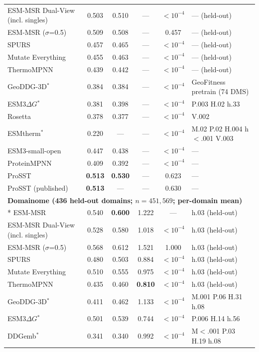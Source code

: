 {\begin{longtable}{lccccl}
ESM-MSR Dual-View (incl. singles) & 0.503 & 0.510 & --- & $<10^{-4}$ & --- (held-out) \\
ESM-MSR ($\sigma$=0.5) & 0.509 & 0.508 & --- & 0.457 & --- (held-out) \\
SPURS & 0.457 & 0.465 & --- & $<10^{-4}$ & --- (held-out) \\
Mutate Everything & 0.455 & 0.463 & --- & $<10^{-4}$ & --- (held-out) \\
ThermoMPNN & 0.439 & 0.442 & --- & $<10^{-4}$ & --- (held-out) \\
GeoDDG-3D$^*$ & 0.384 & 0.384 & --- & $<10^{-4}$ & GeoFitness pretrain (74 DMS) \\
ESM3$\Delta G$$^*$ & 0.381 & 0.398 & --- & $<10^{-4}$ & P.003 H.02 h.33 \\
Rosetta & 0.378 & 0.377 & --- & $<10^{-4}$ & V.002 \\
ESMtherm$^*$ & 0.220 & --- & --- & $<10^{-4}$ & M.02 P.02 H.004 h$<$.001 V.003 \\
ESM3-small-open & 0.447 & 0.438 & --- & $<10^{-4}$ & --- \\
ProteinMPNN & 0.409 & 0.392 & --- & $<10^{-4}$ & --- \\
ProSST & \textbf{0.513} & \textbf{0.530} & --- & 0.623 & --- \\
ProSST (published) & \textbf{0.513} & --- & --- & 0.630 & --- \\
\midrule
\multicolumn{6}{l}{\textbf{Domainome (436 held-out domains; $n=451{,}569$; per-domain mean)}} \\*
\midrule
ESM-MSR & 0.540 & \textbf{0.600} & 1.222 & --- & h.03 (held-out) \\
ESM-MSR Dual-View (incl. singles) & 0.528 & 0.580 & 1.018 & $<10^{-4}$ & h.03 (held-out) \\
ESM-MSR ($\sigma$=0.5) & 0.568 & 0.612 & 1.521 & 1.000 & h.03 (held-out) \\
SPURS & 0.480 & 0.503 & 0.884 & $<10^{-4}$ & h.03 (held-out) \\
Mutate Everything & 0.510 & 0.555 & 0.975 & $<10^{-4}$ & h.03 (held-out) \\
ThermoMPNN & 0.435 & 0.460 & \textbf{0.810} & $<10^{-4}$ & h.03 (held-out) \\
GeoDDG-3D$^*$ & 0.411 & 0.462 & 1.133 & $<10^{-4}$ & M.001 P.06 H.31 h.08 \\
ESM3$\Delta G$$^*$ & 0.501 & 0.539 & 0.744 & $<10^{-4}$ & P.006 H.14 h.56 \\
DDGemb$^*$ & 0.341 & 0.340 & 0.992 & $<10^{-4}$ & M$<$.001 P.03 H.19 h.08 \\

\end{longtable}}
